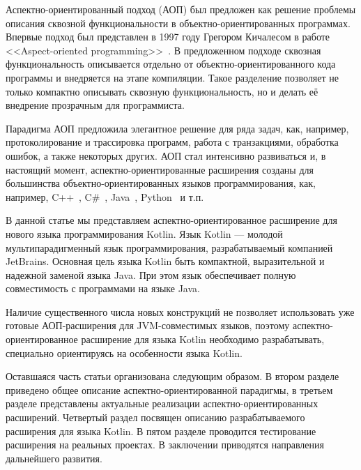 \documentclass[conference]{IEEEtran}
\begin{document}
Аспектно-ориентированный подход (АОП) был предложен как решение проблемы
описания сквозной функциональности в объектно-ориентированных программах.
Впервые подход был представлен в 1997 году Грегором Кичалесом в работе
<<Aspect-oriented programming>>~\cite{kiczales_aop}.
В предложенном подходе сквозная функциональность описывается отдельно от
объектно-ориентированного кода программы и внедряется на этапе компиляции.
Такое разделение позволяет не только компактно описывать сквозную 
функциональность, но и делать её внедрение прозрачным для программиста.

Парадигма АОП предложила элегантное решение для ряда задач, как, например, 
протоколирование и трассировка программ, работа с транзакциями, обработка
ошибок, а также некоторых других.
АОП стал интенсивно развиваться и, в настоящий момент, аспектно-ориентированные
расширения созданы для большинства объектно-ориентированных языков
программирования, как, например, C++~\cite{aspectC_homepage},
C\#~\cite{postsharp_doc}, Java~\cite{aspectj_doc,springAOP_doc},
Python~\cite{spring_python} и т.п.

В данной статье мы представляем аспектно-ориентированное расширение для нового 
языка программирования Kotlin.
Язык Kotlin --- молодой мультипарадигменный язык программирования,
разрабатываемый компанией JetBrains.
Основная цель языка Kotlin быть компактной, выразительной и надежной заменой
языка Java.
При этом язык обеспечивает полную совместимость с программами на языке
Java.

Наличие существенного числа новых конструкций не позволяет использовать уже 
готовые АОП-расширения для JVM-совместимых языков, поэтому
аспектно-ориентированное  расширение для языка Kotlin необходимо разрабатывать,
специально ориентируясь на особенности языка Kotlin. 

Оставшаяся часть статьи организована следующим образом. 
В втором разделе приведено общее описание аспектно-ориентированной парадигмы, 
в третьем разделе представлены актуальные реализации аспектно-ориентированных 
расширений.
Четвертый раздел посвящен описанию разрабатываемого расширения для языка Kotlin.
В пятом разделе проводится тестирование расширения на реальных проектах.
В заключении приводятся направления дальнейшего развития. 

\end{document}
